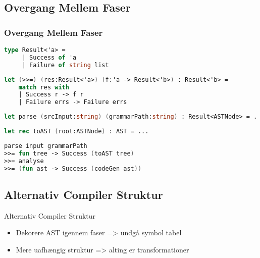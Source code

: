 \subsection{Overgang Mellem Faser}
\begin{frame}[fragile]
  \frametitle{Overgang Mellem Faser}
  \begin{lstlisting}[language=fsharp]
type Result<'a> =
     | Success of 'a
     | Failure of string list
  \end{lstlisting}

  \begin{lstlisting}[language=fsharp]
let (>>=) (res:Result<'a>) (f:'a -> Result<'b>) : Result<'b> =
    match res with
    | Success r -> f r
    | Failure errs -> Failure errs
  \end{lstlisting}

  \begin{lstlisting}[language=fsharp]
let parse (srcInput:string) (grammarPath:string) : Result<ASTNode> = ...
  \end{lstlisting}

  \begin{lstlisting}[language=fsharp]
let rec toAST (root:ASTNode) : AST = ...
  \end{lstlisting}
  
  \begin{lstlisting}[language=fsharp]
parse input grammarPath 
>>= fun tree -> Success (toAST tree)
>>= analyse
>>= (fun ast -> Success (codeGen ast))
  \end{lstlisting}

\end{frame}

\subsection{Alternativ Compiler Struktur}
\begin{frame}{Alternativ Compiler Struktur}
  \begin{itemize}
    \item Dekorere AST igennem faser => undgå symbol tabel
    \item Mere uafhængig struktur => alting er transformationer
  \end{itemize}

\end{frame}